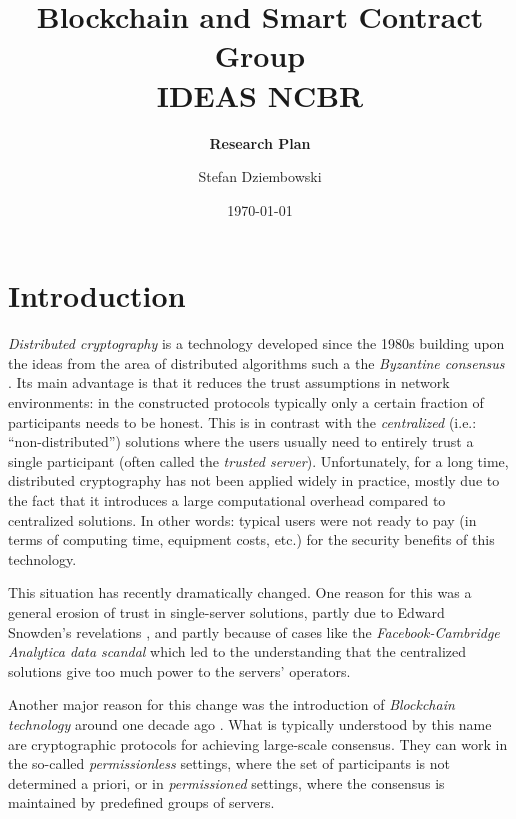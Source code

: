 \documentclass{article}
\title{\textbf{Blockchain and Smart Contract Group\\ IDEAS NCBR}}
\subtitle{\textbf{Research Plan}}
\date{\today}
\author{Stefan Dziembowski}
\begin{document}
	
\maketitle

\section{Introduction}


\emph{Distributed cryptography} is a technology developed since the 1980s \cite{DBLP:conf/focs/Yao86,DBLP:conf/stoc/GoldreichMW87,DBLP:conf/crypto/ChaumCD87,DBLP:conf/stoc/Ben-OrGW88} building upon the ideas from the area of distributed algorithms such a the \emph{Byzantine consensus} \cite{DBLP:journals/toplas/LamportSP82}.  Its main advantage is that it reduces the trust assumptions in network environments: in the constructed protocols typically only a certain fraction of participants needs to be honest. This is in contrast with the \emph{centralized} (i.e.: ``non-distributed'') solutions where the users usually need to entirely trust a single participant (often called the \emph{trusted server}). Unfortunately, for a long time, distributed cryptography has not been applied widely in practice, mostly due to the fact that it introduces a large computational overhead compared to centralized solutions. In other words: typical users were not ready to pay (in terms of computing time, equipment costs, etc.) for the security benefits of this technology.

This situation has recently dramatically changed. One reason for this was a general erosion of trust in single-server solutions, partly due to Edward Snowden's revelations  \cite{enwiki:1029775076}, and partly because of cases like the \emph{Facebook-Cambridge Analytica data scandal} \cite{enwiki:1029165846} which led to the understanding that the centralized solutions give too much power to the servers' operators. 

Another major reason for this change was the introduction of \emph{Blockchain technology} around one decade ago \cite{nakamoto2008bitcoin}. 
What is typically understood by this name are cryptographic protocols for achieving large-scale consensus. They can work in the so-called \emph{permissionless} settings, where the set of participants is not determined a priori, or in \emph{permissioned} settings, where the consensus is maintained by predefined groups of servers. 
\end{document}

